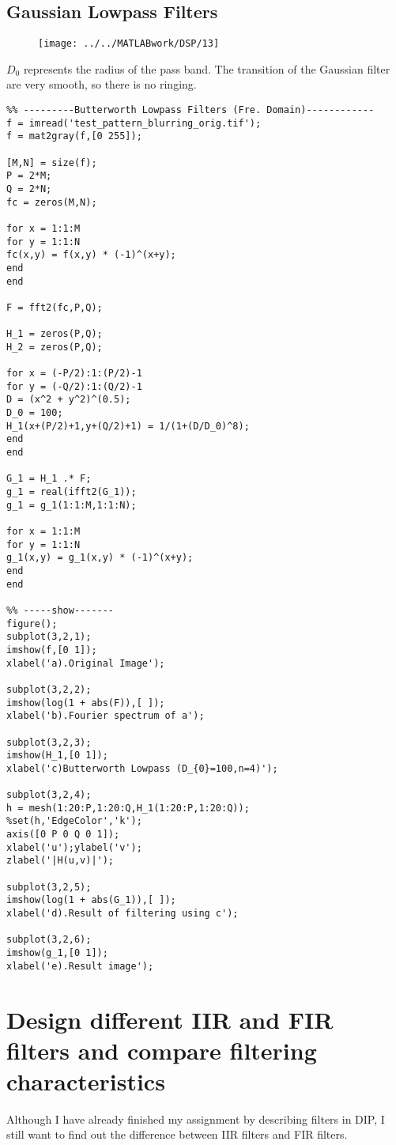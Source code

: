 \documentclass[12pt,a4paper]{article}
\begin{document}
\subsection{Gaussian Lowpass Filters}
\begin{figure}[ht]
	\begin{center}
		\texttt{[image: ../../MATLABwork/DSP/13]}
	\end{center}
\end{figure}
$D_0$ represents the radius of the pass band. The transition of the Gaussian filter are very smooth, so there is no ringing.
\lstset{language=Matlab}
\begin{lstlisting}
%% ---------Butterworth Lowpass Filters (Fre. Domain)------------
f = imread('test_pattern_blurring_orig.tif');
f = mat2gray(f,[0 255]);

[M,N] = size(f);
P = 2*M;
Q = 2*N;
fc = zeros(M,N);

for x = 1:1:M
for y = 1:1:N
fc(x,y) = f(x,y) * (-1)^(x+y);
end
end

F = fft2(fc,P,Q);

H_1 = zeros(P,Q);
H_2 = zeros(P,Q);

for x = (-P/2):1:(P/2)-1
for y = (-Q/2):1:(Q/2)-1
D = (x^2 + y^2)^(0.5);
D_0 = 100;
H_1(x+(P/2)+1,y+(Q/2)+1) = 1/(1+(D/D_0)^8);   
end
end

G_1 = H_1 .* F;
g_1 = real(ifft2(G_1));
g_1 = g_1(1:1:M,1:1:N);

for x = 1:1:M
for y = 1:1:N
g_1(x,y) = g_1(x,y) * (-1)^(x+y);
end
end

%% -----show-------
figure();
subplot(3,2,1);
imshow(f,[0 1]);
xlabel('a).Original Image');

subplot(3,2,2);
imshow(log(1 + abs(F)),[ ]);
xlabel('b).Fourier spectrum of a');

subplot(3,2,3);
imshow(H_1,[0 1]);
xlabel('c)Butterworth Lowpass (D_{0}=100,n=4)');

subplot(3,2,4);
h = mesh(1:20:P,1:20:Q,H_1(1:20:P,1:20:Q));
%set(h,'EdgeColor','k');
axis([0 P 0 Q 0 1]);
xlabel('u');ylabel('v');
zlabel('|H(u,v)|');

subplot(3,2,5);
imshow(log(1 + abs(G_1)),[ ]);
xlabel('d).Result of filtering using c');

subplot(3,2,6);
imshow(g_1,[0 1]);
xlabel('e).Result image');
\end{lstlisting}

\section{Design different IIR and FIR filters and compare filtering characteristics}
Although I have already finished my assignment by describing filters in DIP, I still want to find out the difference between IIR filters and FIR filters.
\end{document}
